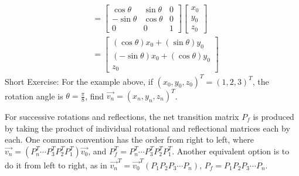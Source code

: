 \begin{exmp}
\begin{align*}
&=
\begin{bmatrix}
\cos \theta & \sin \theta & 0 \\
-\sin \theta & \cos \theta & 0 \\
0 & 0 & 1
\end{bmatrix}
\begin{bmatrix}
x_0 \\
y_0 \\
z_0
\end{bmatrix} \\
&=
\begin{bmatrix}
(\cos\theta)x_0+(\sin\theta)y_0 \\
(-\sin\theta)x_0+(\cos\theta)y_0 \\
z_0
\end{bmatrix}
\end{align*}
Short Exercise: For the example above, if $(x_0, y_0, z_0)^T = (1,2,3)^T$, the rotation angle is $\theta = \frac{\pi}{8}$, find $\vec{v_n} = (x_n, y_n, z_n)^T$.
\end{exmp}

For successive rotations and reflections, the net transition matrix $P_f$ is produced by taking the product of individual rotational and reflectional matrices each by each. One common convention has the order from right to left, where $\vec{v_n} = (P_n^T\cdots P_3^TP_2^TP_1^T)\vec{v_0}$, and $P_f^T = P_n^T\cdots P_3^TP_2^TP_1^T$. Another equivalent option is to do it from left to right, as in
$\vec{v_n}^T = \vec{v_0}^T(P_1P_2P_3\cdots P_n)$, $P_f = P_1P_2P_3\cdots P_n$.

